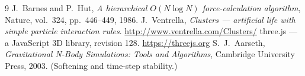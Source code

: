 \documentclass[10pt,a4paper]{article}
\begin{document}
\begin{thebibliography}{9}
\small
\setlength{\itemsep}{0pt}\setlength{\parskip}{0pt}
 J.~Barnes and P.~Hut, \emph{A hierarchical $O(N \log N)$ force-calculation algorithm}, Nature, vol.~324, pp.~446--449, 1986.
 J.~Ventrella, \emph{Clusters --- artificial life with simple particle interaction rules}. \url{http://www.ventrella.com/Clusters/}
 three.js --- a JavaScript 3D library, revision 128. \url{https://threejs.org}
 S.~J.~Aarseth, \emph{Gravitational N-Body Simulations: Tools and Algorithms}, Cambridge University Press, 2003. (Softening and time-step stability.)
\end{thebibliography}
\end{document}
